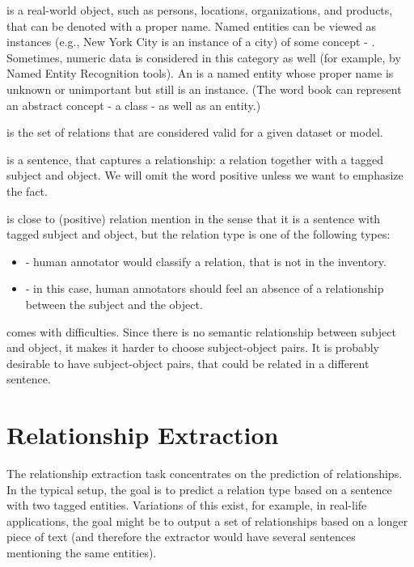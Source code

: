  is a real-world object, such as persons, locations, organizations, and products, that can be denoted with a proper name. Named entities can be viewed as instances (e.g., New York City is an instance of a city) of some concept - . Sometimes, numeric data is considered in this category as well (for example, by Named Entity Recognition tools). An  is a named entity whose proper name is unknown or unimportant but still is an instance. (The word book can represent an abstract concept - a class - as well as an entity.) 

 is the set of relations that are considered valid for a given dataset or model.

 is a sentence, that captures a relationship: a relation together with a tagged subject and object. We will omit the word positive unless we want to emphasize the fact.

 is close to (positive) relation mention in the sense that it is a sentence with tagged subject and object, but the relation type is one of the following types: 
\begin{itemize}
\item {} - human annotator would classify a relation, that is not in the inventory.
\item {} - in this case, human annotators should feel an absence of a relationship between the subject and the object. 

\end{itemize}

 comes with difficulties. Since there is no semantic relationship between subject and object, it makes it harder to choose subject-object pairs. It is probably desirable to have subject-object pairs, that could be related in a different sentence.


\section{Relationship Extraction}

The relationship extraction task concentrates on the prediction of relationships. In the typical setup, the goal is to predict a relation type based on a sentence with two tagged entities. Variations of this exist, for example, in real-life applications, the goal might be to output a set of relationships based on a longer piece of text (and therefore the extractor would have several sentences mentioning the same entities). 

